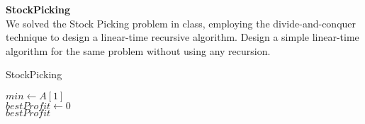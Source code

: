 \textbf{StockPicking} \\
We solved the Stock Picking problem in class, employing the divide-and-conquer technique to design a
linear-time recursive algorithm. Design a simple linear-time algorithm for the same problem without
using any recursion.

\begin{customsolutionbox}
    \begin{algorithm}[H]
        \caption{StockPicking}
        \SetAlgoLined
         {
            $min \gets A[1]$ \\
            $bestProfit \gets 0$\\
            \KwRet $bestProfit$ \\
        }
    \end{algorithm}
\end{customsolutionbox}
